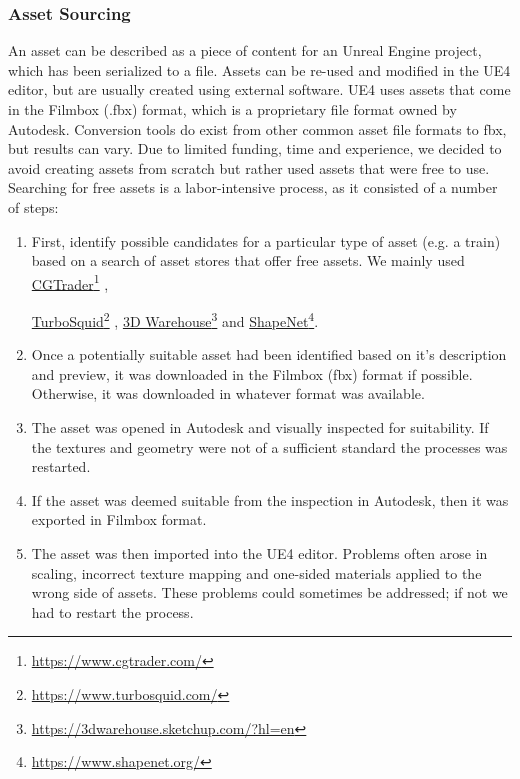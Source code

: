 \subsubsection{Asset Sourcing}
An asset can be described as a piece of content for an Unreal Engine project, which has been serialized to a file. Assets can be re-used and modified in the UE4 editor, but are usually created using external software. UE4 uses assets that come in the Filmbox (.fbx) format, which is a proprietary file format owned by Autodesk. Conversion tools do exist from other common asset file formats to fbx, but results can vary. Due to limited funding, time and experience, we decided to avoid creating assets from scratch but rather used assets that were free to use. Searching for free assets is a labor-intensive process, as it consisted of a number of steps:
\begin{enumerate}
    \item First, identify possible candidates for a particular type of asset (e.g. a train) based on a search of asset stores that offer free assets. We mainly used \href{https://www.cgtrader.com/}{CGTrader}\footnote{\href {https://www.cgtrader.com/}{https://www.cgtrader.com/}} ,
    
    \href{https://www.turbosquid.com/}{TurboSquid}\footnote{\href {https://www.turbosquid.com/}{https://www.turbosquid.com/}}
    , 
    \href{https://3dwarehouse.sketchup.com/?hl=en}{3D Warehouse}\footnote{\href {https://3dwarehouse.sketchup.com/?hl=en}{https://3dwarehouse.sketchup.com/?hl=en}} 
    and
    \href{https://www.shapenet.org/}{ShapeNet}\footnote{\href {https://www.shapenet.org/}{https://www.shapenet.org/}}.
    
    \item Once a potentially suitable asset had been identified based on it's description and preview, it was downloaded in the Filmbox (fbx) format if possible. Otherwise, it was downloaded in whatever format was available. 
    \item The asset was opened in Autodesk  and visually inspected for suitability. If the textures and geometry were not of a sufficient standard the processes was restarted.
    \item If the asset was deemed suitable from the inspection in Autodesk, then it was exported in Filmbox format.
    \item The asset was then imported into the UE4 editor. Problems often arose in scaling, incorrect texture mapping and one-sided materials applied to the wrong side of assets. These problems could sometimes be addressed; if not we had to restart the process.
\end{enumerate}

